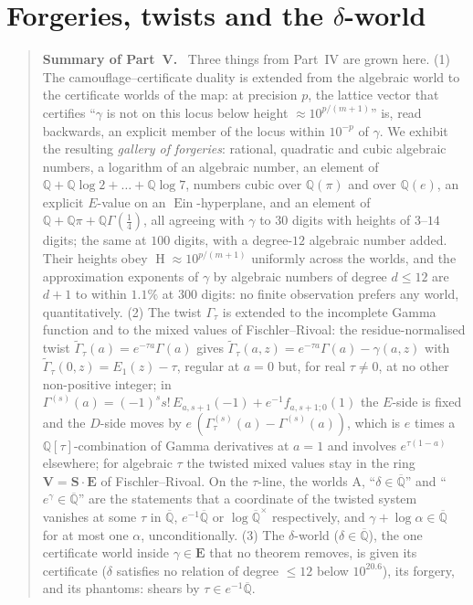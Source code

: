 \documentclass[11pt,a4paper]{article}
\newcommand{\Q}{\mathbb Q}
\newcommand{\Qbar}{\overline{\mathbb Q}}
\newcommand{\Ein}{\operatorname{Ein}}
\newcommand{\EE}{\mathbf E}
\newcommand{\Sring}{\mathbf S}
\newcommand{\Vring}{\mathbf V}
\DeclareMathOperator{\Ht}{H}
\theoremstyle{definition}
\theoremstyle{remark}
\numberwithin{equation}{section}
\newenvironment{partsummary}[1]{\begin{quotation}\small\noindent\textbf{Summary of Part~#1.}\ }{\end{quotation}}
\begin{document}
\part{Forgeries, twists and the $\delta$-world}
\begin{partsummary}{V}
Three things from Part~IV are grown here. (1) The camouflage--certificate duality is
extended from the algebraic world to the certificate worlds of the map: at precision $p$,
the lattice vector that certifies ``$\gamma$ is not on this locus below height
$\approx10^{p/(m+1)}$'' is, read backwards, an explicit member of the locus within
$10^{-p}$ of $\gamma$. We exhibit the resulting \emph{gallery of forgeries}: rational,
quadratic and cubic algebraic numbers, a logarithm of an algebraic number, an element of
$\Q+\Q\log2+\dots+\Q\log7$, numbers cubic over $\Q(\pi)$ and over $\Q(e)$, an explicit
$E$-value on an $\Ein$-hyperplane, and an element of $\Q+\Q\pi+\Q\Gamma(\tfrac14)$, all
agreeing with $\gamma$ to $30$ digits with heights of $3$--$14$ digits; the same at $100$
digits, with a degree-$12$ algebraic number added. Their heights obey
$\Ht\approx10^{p/(m+1)}$ uniformly across the worlds, and the approximation exponents of
$\gamma$ by algebraic numbers of degree $d\le12$ are $d+1$ to within $1.1\%$ at $300$
digits: no finite observation prefers any world, quantitatively. (2) The twist $\Gamma_\tau$ is extended to
the incomplete Gamma function and to the mixed values of Fischler--Rivoal: the
residue-normalised twist $\widetilde\Gamma_\tau(a)=e^{-\tau a}\Gamma(a)$ gives
$\widetilde\Gamma_\tau(a,z)=e^{-\tau a}\Gamma(a)-\gamma(a,z)$ with
$\widetilde\Gamma_\tau(0,z)=E_1(z)-\tau$, regular at $a=0$ but, for real $\tau\ne0$, at no
other non-positive integer; in $\Gamma^{(s)}(a)=(-1)^ss!\,E_{a,s+1}(-1)+e^{-1}f_{a,s+1;0}(1)$
the $E$-side is fixed and the $D$-side moves by $e\,(\Gamma_\tau^{(s)}(a)-\Gamma^{(s)}(a))$,
which is $e$ times a $\Q[\tau]$-combination of Gamma derivatives at $a=1$ and involves
$e^{\tau(1-a)}$ elsewhere; for algebraic $\tau$ the twisted mixed values stay in the ring
$\Vring=\Sring\cdot\EE$ of Fischler--Rivoal. On the $\tau$-line, the worlds $\mathrm A$,
``$\delta\in\Qbar$'' and ``$e^\gamma\in\Qbar$'' are the statements that a coordinate of the
twisted system vanishes at some $\tau$ in $\Qbar$, $e^{-1}\Qbar$ or $\log\Qbar^\times$
respectively, and $\gamma+\log\alpha\in\Qbar$ for at most one $\alpha$, unconditionally.
(3) The $\delta$-world ($\delta\in\Qbar$), the one certificate world inside $\gamma\in\EE$
that no theorem removes, is given its certificate ($\delta$ satisfies no relation of degree
$\le12$ below $10^{20.6}$), its forgery, and its phantoms: shears by $\tau\in e^{-1}\Qbar$.
\end{partsummary}
\end{document}
